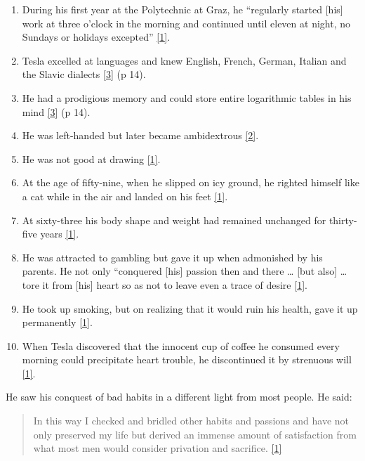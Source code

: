 \documentclass[
  a4paper,
]{article}
\providecommand{\tightlist}{%
  \setlength{\itemsep}{0pt}\setlength{\parskip}{0pt}}
\begin{document}
\begin{enumerate}
\tightlist
\item
  During his first year at the Polytechnic at Graz, he ``regularly
  started {[}his{]} work at three o'clock in the morning and continued
  until eleven at night, no Sundays or holidays excepted''
  \protect\hyperlink{ref-john83}{{[}1{]}}.
\item
  Tesla excelled at languages and knew English, French, German, Italian
  and the Slavic dialects \protect\hyperlink{ref-cheney81}{{[}3{]}} (p
  14).
\item
  He had a prodigious memory and could store entire logarithmic tables
  in his mind \protect\hyperlink{ref-cheney81}{{[}3{]}} (p 14).
\item
  He was left-handed but later became ambidextrous
  \protect\hyperlink{ref-oneill80}{{[}2{]}}.
\item
  He was not good at drawing \protect\hyperlink{ref-john83}{{[}1{]}}.
\item
  At the age of fifty-nine, when he slipped on icy ground, he righted
  himself like a cat while in the air and landed on his feet
  \protect\hyperlink{ref-john83}{{[}1{]}}.
\item
  At sixty-three his body shape and weight had remained unchanged for
  thirty-five years \protect\hyperlink{ref-john83}{{[}1{]}}.
\item
  He was attracted to gambling but gave it up when admonished by his
  parents. He not only ``conquered {[}his{]} passion then and there
  \ldots{} {[}but also{]} \ldots{} tore it from {[}his{]} heart so as
  not to leave even a trace of desire
  \protect\hyperlink{ref-john83}{{[}1{]}}.
\item
  He took up smoking, but on realizing that it would ruin his health,
  gave it up permanently \protect\hyperlink{ref-john83}{{[}1{]}}.
\item
  When Tesla discovered that the innocent cup of coffee he consumed
  every morning could precipitate heart trouble, he discontinued it by
  strenuous will \protect\hyperlink{ref-john83}{{[}1{]}}.
\end{enumerate}

He saw his conquest of bad habits in a different light from most people.
He said:

\begin{quote}
In this way I checked and bridled other habits and passions and have not
only preserved my life but derived an immense amount of satisfaction
from what most men would consider privation and sacrifice.
\protect\hyperlink{ref-john83}{{[}1{]}}
\end{quote}
\end{document}
